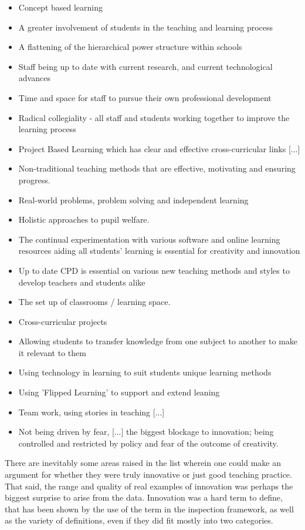\begin{itemize}
\item Concept based learning
\item A greater involvement of students in the teaching and learning process
\item A flattening of the hierarchical power structure within schools
\item Staff being up to date with current research, and current technological advances
\item Time and space for staff to pursue their own professional development
\item Radical collegiality - all staff and students working together to improve the learning process
\item Project Based Learning which has clear and effective cross-curricular links [...]
\item Non-traditional teaching methods that are effective, motivating and ensuring progress.
\item Real-world problems, problem solving and independent learning
\item Holistic approaches to pupil welfare.
\item The continual experimentation with various software and online learning resources aiding all students' learning is essential for creativity and innovation
\item Up to date CPD is essential on various new teaching methods and styles to develop teachers and students alike
\item The set up of classrooms / learning space.
\item Cross-curricular projects
\item Allowing students to transfer knowledge from one subject to another to make it relevant to them
\item Using technology in learning to suit students unique learning methods
\item Using 'Flipped Learning' to support and extend leaning
\item Team work, using stories in teaching [...]
\item Not being driven by fear, [...] the biggest blockage to innovation; being controlled and restricted by policy and fear of the outcome of creativity.
\end{itemize}

There are inevitably some areas raised in the list wherein one could make an argument for whether they were truly innovative or just good teaching practice. That said, the range and quality of real examples of innovation was perhaps the biggest surprise to arise from the data. Innovation was a hard term to define, that has been shown by the use of the term in the inspection framework, as well as the variety of definitions, even if they did fit mostly into two categories. 

